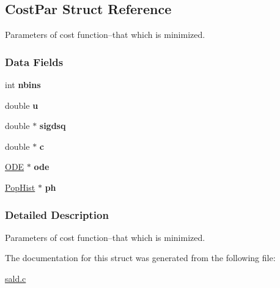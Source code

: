 \hypertarget{struct_cost_par}{\subsection{Cost\+Par Struct Reference}
\label{struct_cost_par}
}


Parameters of cost function--that which is minimized.  


\subsubsection*{Data Fields}
\begin{DoxyCompactItemize}
\item 
\hypertarget{struct_cost_par_add5e631d434542a5173e30adcdede123}{int {\bfseries nbins}}\label{struct_cost_par_add5e631d434542a5173e30adcdede123}

\item 
\hypertarget{struct_cost_par_a04723f4d0a1e478c0025637820342aae}{double {\bfseries u}}\label{struct_cost_par_a04723f4d0a1e478c0025637820342aae}

\item 
\hypertarget{struct_cost_par_a602b33f175bb882f5099e61775821a49}{double $\ast$ {\bfseries sigdsq}}\label{struct_cost_par_a602b33f175bb882f5099e61775821a49}

\item 
\hypertarget{struct_cost_par_ae9baf57b32f714ebbd39510ab9309d48}{double $\ast$ {\bfseries c}}\label{struct_cost_par_ae9baf57b32f714ebbd39510ab9309d48}

\item 
\hypertarget{struct_cost_par_ac7b1e6bd6efc3002a923b7ce7ecff394}{\hyperlink{struct_o_d_e}{O\+D\+E} $\ast$ {\bfseries ode}}\label{struct_cost_par_ac7b1e6bd6efc3002a923b7ce7ecff394}

\item 
\hypertarget{struct_cost_par_a5204e90608fc9e6d04c616c5bc837a27}{\hyperlink{struct_pop_hist}{Pop\+Hist} $\ast$ {\bfseries ph}}\label{struct_cost_par_a5204e90608fc9e6d04c616c5bc837a27}

\end{DoxyCompactItemize}


\subsubsection{Detailed Description}
Parameters of cost function--that which is minimized. 



The documentation for this struct was generated from the following file\+:\begin{DoxyCompactItemize}
\item 
\hyperlink{sald_8c}{sald.\+c}\end{DoxyCompactItemize}
